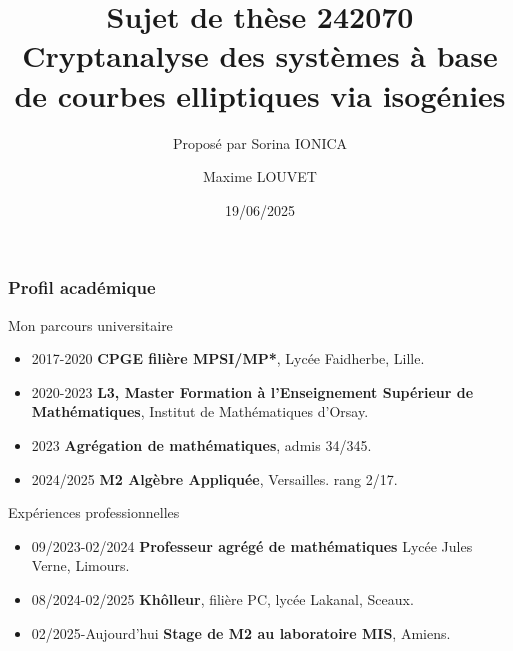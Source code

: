 \documentclass[11pt]{beamer}
\begin{document}
	\author[Maxime LOUVET]{Maxime LOUVET}
	\title[Audition EDSTS]{Sujet de thèse 242070 \\ Cryptanalyse des systèmes à base de courbes elliptiques via isogénies}
	\subtitle{Proposé par Sorina IONICA}
	\date[19/06/2025]{19/06/2025}
	\begin{frame}[plain]
		\maketitle
	\end{frame}
	
	\begin{frame}
		\frametitle{Profil académique}
		\begin{block}{Mon parcours universitaire}
			\begin{itemize}
				\item 2017-2020 \textbf{CPGE filière MPSI/MP*},
				Lycée Faidherbe, Lille.
				
				\item 2020-2023 \textbf{L3, Master Formation à l'Enseignement Supérieur de Mathématiques}, Institut de Mathématiques d'Orsay.
				
				\item 2023 \textbf{Agrégation de mathématiques}, admis 34/345. 
				
				\item<2-> 2024/2025 \textbf{M2 Algèbre Appliquée}, Versailles. rang 2/17.
				
			\end{itemize}
		\end{block}
		
		\begin{block}{Expériences professionnelles}
			\begin{itemize}
				
				\item 09/2023-02/2024 \textbf{Professeur agrégé de mathématiques}
				Lycée Jules Verne, Limours.
				
				\item<2-> 08/2024-02/2025 \textbf{Khôlleur}, filière PC, lycée Lakanal, Sceaux.
				
				\item<2-> 02/2025-Aujourd'hui \textbf{Stage de M2 au laboratoire MIS}, Amiens.
				
			\end{itemize}
		\end{block}
		
	\end{frame}
	
\end{document}
